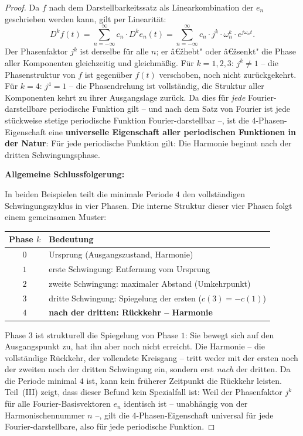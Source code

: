 ﻿\documentclass[a4paper,12pt]{article}
\theoremstyle{definition}
\begin{document}
\begin{proof}
\medskip
Da $f$ nach dem Darstellbarkeitssatz als Linearkombination der $e_n$ geschrieben werden
kann, gilt per Linearität:
\begin{equation}
	D^k f(t)
	= \sum_{n=-\infty}^{\infty} c_n \cdot D^k e_n(t)
	= \sum_{n=-\infty}^{\infty} c_n \cdot j^k \cdot \omega_n^k \cdot e^{j\omega_n t}.
\end{equation}
Der Phasenfaktor $j^k$ ist derselbe für alle $n$; er â€žhebt" oder â€žsenkt" die Phase
aller Komponenten gleichzeitig und gleichmäßig. Für $k = 1, 2, 3$: $j^k \neq 1$
-- die Phasenstruktur von $f$ ist gegenüber $f(t)$ verschoben, noch nicht zurückgekehrt.
Für $k = 4$: $j^4 = 1$ -- die Phasendrehung ist vollständig, die Struktur aller
Komponenten kehrt zu ihrer Ausgangslage zurück. Da dies für \textit{jede}
Fourier-darstellbare periodische Funktion gilt -- und nach dem Satz von Fourier
ist jede stückweise stetige periodische Funktion Fourier-darstellbar --, ist
die 4-Phasen-Eigenschaft eine \textbf{universelle Eigenschaft aller periodischen
Funktionen in der Natur}: Für jede periodische Funktion gilt: Die Harmonie beginnt nach der dritten Schwingungsphase.

\medskip
\textbf{Allgemeine Schlussfolgerung:}

In beiden Beispielen teilt die minimale Periode $4$ den vollständigen Schwingungszyklus
in vier Phasen. Die interne Struktur dieser vier Phasen folgt einem gemeinsamen Muster:

\begin{center}
\begin{tabular}{cl}
	\toprule
	Phase $k$ & Bedeutung \\
	\midrule
	$0$ & Ursprung (Ausgangszustand, Harmonie) \\
	$1$ & erste Schwingung: Entfernung vom Ursprung \\
	$2$ & zweite Schwingung: maximaler Abstand (Umkehrpunkt) \\
	$3$ & dritte Schwingung: Spiegelung der ersten ($c(3) = -c(1)$) \\
	$4$ & \textbf{nach der dritten: Rückkehr -- Harmonie} \\
	\bottomrule
\end{tabular}
\end{center}

Phase $3$ ist strukturell die Spiegelung von Phase $1$: Sie bewegt sich auf den
Ausgangspunkt zu, hat ihn aber noch nicht erreicht. Die Harmonie -- die vollständige
Rückkehr, der vollendete Kreisgang -- tritt weder mit der ersten noch der zweiten
noch der dritten Schwingung ein, sondern erst \textit{nach} der dritten.
Da die Periode minimal $4$ ist, kann kein früherer Zeitpunkt die Rückkehr leisten.
Teil~(III) zeigt, dass dieser Befund kein Spezialfall ist: Weil der Phasenfaktor
$j^k$ für alle Fourier-Basisvektoren $e_n$ identisch ist -- unabhängig von der
Harmonischennummer $n$ --, gilt die 4-Phasen-Eigenschaft universal für jede
Fourier-darstellbare, also für jede periodische Funktion.
\end{proof}
\end{document}
